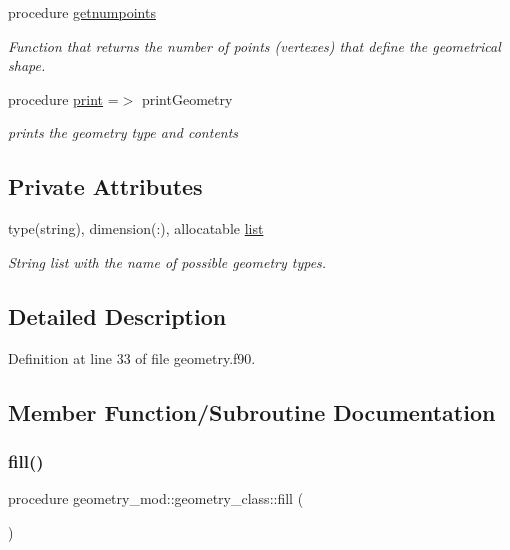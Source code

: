 \begin{DoxyCompactItemize}
procedure \mbox{\hyperlink{structgeometry__mod_1_1geometry__class_a8988388d683fbf7e5727a39b71d3c479}{getnumpoints}}
\begin{DoxyCompactList}\small\item\em Function that returns the number of points (vertexes) that define the geometrical shape. \end{DoxyCompactList}\item 
procedure \mbox{\hyperlink{structgeometry__mod_1_1geometry__class_afbb83bea5cd3f73708b448d3c732ea7c}{print}} =$>$ print\+Geometry
\begin{DoxyCompactList}\small\item\em prints the geometry type and contents \end{DoxyCompactList}\end{DoxyCompactItemize}
\subsection*{Private Attributes}
\begin{DoxyCompactItemize}
\item 
type(string), dimension(\+:), allocatable \mbox{\hyperlink{structgeometry__mod_1_1geometry__class_a218ff308d9bb94f4386573d7329babc6}{list}}
\begin{DoxyCompactList}\small\item\em String list with the name of possible geometry types. \end{DoxyCompactList}\end{DoxyCompactItemize}


\subsection{Detailed Description}


Definition at line 33 of file geometry.\+f90.



\subsection{Member Function/\+Subroutine Documentation}
\mbox{\label{structgeometry__mod_1_1geometry__class_a0afee5607f0e2443a862741e40794368}} 
\subsubsection{\texorpdfstring{fill()}{fill()}}
{\footnotesize\ttfamily procedure geometry\+\_\+mod\+::geometry\+\_\+class\+::fill (\begin{DoxyParamCaption}{ }\end{DoxyParamCaption})\hspace{0.3cm}{\ttfamily [private]}}



